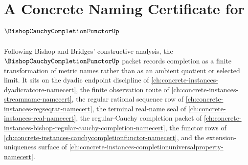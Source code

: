 \chapter{A Concrete Naming Certificate for $\BishopCauchyCompletionFunctorUp$}
\label{ch:concrete-instances-bishop-cauchy-completion-functor-namecert}

Following Bishop and Bridges' constructive analysis, the $\BishopCauchyCompletionFunctorUp$ packet records completion as a finite transformation of metric names rather than as an ambient quotient or selected limit. It sits on the dyadic endpoint discipline of \autoref{ch:concrete-instances-dyadicratcore-namecert}, the finite observation route of \autoref{ch:concrete-instances-streamname-namecert}, the regular rational sequence row of \autoref{ch:concrete-instances-regseqrat-namecert}, the terminal real-name seal of \autoref{ch:concrete-instances-real-namecert}, the regular-Cauchy completion packet of \autoref{ch:concrete-instances-bishop-regular-cauchy-completion-namecert}, the functor rows of \autoref{ch:concrete-instances-cauchycompletionfunctor-namecert}, and the extension-uniqueness surface of \autoref{ch:concrete-instances-completionuniversalproperty-namecert}.

